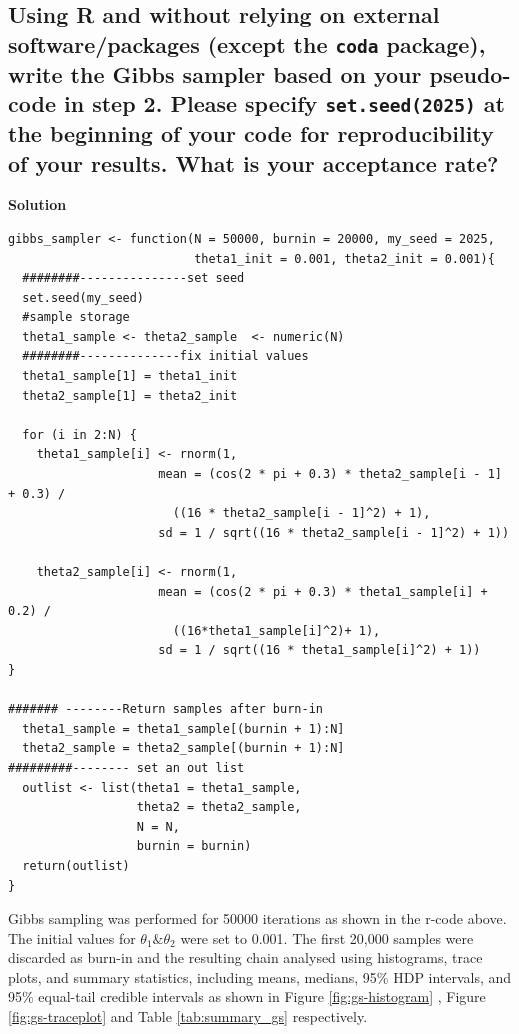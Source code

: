 \documentclass[12pt]{article}
\begin{document}
\subsection{Using R and without relying on external software/packages (except the \texttt{coda} package), write the Gibbs sampler based on your pseudo-code in step 2. Please specify \texttt{set.seed(2025)} at the beginning of your code for reproducibility of your results. What is your acceptance rate?}

\textbf{Solution}

\begin{lstlisting}
gibbs_sampler <- function(N = 50000, burnin = 20000, my_seed = 2025,
                          theta1_init = 0.001, theta2_init = 0.001){
  ########---------------set seed
  set.seed(my_seed)
  #sample storage
  theta1_sample <- theta2_sample  <- numeric(N)
  ########--------------fix initial values
  theta1_sample[1] = theta1_init
  theta2_sample[1] = theta2_init
  
  for (i in 2:N) {
    theta1_sample[i] <- rnorm(1,
                     mean = (cos(2 * pi + 0.3) * theta2_sample[i - 1] + 0.3) /
                       ((16 * theta2_sample[i - 1]^2) + 1),
                     sd = 1 / sqrt((16 * theta2_sample[i - 1]^2) + 1))
  
    theta2_sample[i] <- rnorm(1,
                     mean = (cos(2 * pi + 0.3) * theta1_sample[i] + 0.2) /
                       ((16*theta1_sample[i]^2)+ 1),
                     sd = 1 / sqrt((16 * theta1_sample[i]^2) + 1))
}

####### --------Return samples after burn-in
  theta1_sample = theta1_sample[(burnin + 1):N]
  theta2_sample = theta2_sample[(burnin + 1):N]
#########-------- set an out list
  outlist <- list(theta1 = theta1_sample,
                  theta2 = theta2_sample,
                  N = N,
                  burnin = burnin)
  return(outlist)
}

\end{lstlisting}

Gibbs sampling was performed for 50000 iterations  as shown  in the r-code above. The initial values for $\theta_1 \& \theta_2$ were set to 0.001. The first 20,000 samples were discarded as burn-in and the resulting chain analysed using histograms, trace plots, and summary statistics, including means, medians, 95\% HDP intervals, and 95\% equal-tail credible intervals as shown in Figure \ref{fig:gs-histogram} , Figure \ref{fig:gs-traceplot} and Table \ref{tab:summary_gs} respectively.
\end{document}
